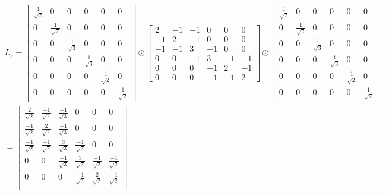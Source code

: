 \documentclass{article}
\begin{document}
\begin{multline*}
  L_s = \begin{bmatrix}
      \frac{1}{\sqrt{2}} & 0 & 0 & 0 & 0 & 0 \\
      0 & \frac{1}{\sqrt{2}} & 0 & 0 & 0 & 0 \\
      0 & 0 & \frac{1}{\sqrt{3}} & 0 & 0 & 0 \\
      0 & 0 & 0 & \frac{1}{\sqrt{3}} & 0 & 0 \\
      0 & 0 & 0 & 0 & \frac{1}{\sqrt{2}} & 0 \\
      0 & 0 & 0 & 0 & 0 & \frac{1}{\sqrt{2}}
    \end{bmatrix}
    \odot \begin{bmatrix}
      2  & -1 & -1 & 0  & 0  & 0 \\
      -1 & 2  & -1 & 0  & 0  & 0 \\
      -1 & -1 & 3  & -1 & 0  & 0 \\
      0  & 0  & -1 & 3  & -1 & -1 \\
      0  & 0  & 0  & -1 & 2  & -1 \\
      0  & 0  & 0  & -1 & -1 & 2
    \end{bmatrix}
    \odot \begin{bmatrix}
      \frac{1}{\sqrt{2}} & 0 & 0 & 0 & 0 & 0 \\
      0 & \frac{1}{\sqrt{2}} & 0 & 0 & 0 & 0 \\
      0 & 0 & \frac{1}{\sqrt{3}} & 0 & 0 & 0 \\
      0 & 0 & 0 & \frac{1}{\sqrt{3}} & 0 & 0 \\
      0 & 0 & 0 & 0 & \frac{1}{\sqrt{2}} & 0 \\
      0 & 0 & 0 & 0 & 0 & \frac{1}{\sqrt{2}}
    \end{bmatrix} \\
    = \begin{bmatrix}
      \frac{2}{\sqrt{2}}  & \frac{-1}{\sqrt{2}} & \frac{-1}{\sqrt{3}} & 0 & 0 & 0 \\
      \frac{-1}{\sqrt{2}} & \frac{2}{\sqrt{2}}  & \frac{-1}{\sqrt{3}} & 0 & 0 & 0 \\
      \frac{-1}{\sqrt{2}} & \frac{-1}{\sqrt{2}} & \frac{3}{\sqrt{3}}  & \frac{-1}{\sqrt{3}} & 0 & 0 \\
      0                   & 0                   & \frac{-1}{\sqrt{3}} & \frac{3}{\sqrt{3}}  & \frac{-1}{\sqrt{2}} & \frac{-1}{\sqrt{2}} \\
      0                   & 0                   & 0                   & \frac{-1}{\sqrt{3}} & \frac{2}{\sqrt{2}}  & \frac{-1}{\sqrt{2}} \\

\end{bmatrix}
\end{multline*}
\end{document}
